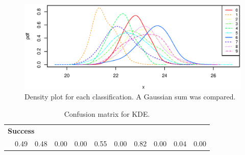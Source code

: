 \begin{figure}[H]
    \includegraphics[width = \textwidth]{graphics/kde_graphs}
    \caption{Density plot for each classification. A Gaussian sum was compared.}
    \label{fig:pdf_gaussian_kde}
\end{figure}

\begin{table}[H]
\centering
         \begin{subtable}{0.75\textwidth}
        \centering
    \end{subtable}
    
    \begin{subtable}{0.05\textwidth}
        \flushright
    \end{subtable}
    \begin{subtable}{0.7\textwidth}
            \centering
                \begin{tabular}{l|*{10}{c}}
                    
                    \multicolumn{11}{l}{\bf Success}\\
                    \multicolumn{1}{l}{}&0.49&0.48&0.00&0.00&0.55&0.00&0.82&0.00&0.04&0.00\\
                \end{tabular}
    \end{subtable}
    \caption{Confusion matrix for KDE.}
    \label{tb:kde_confus}
\end{table}
